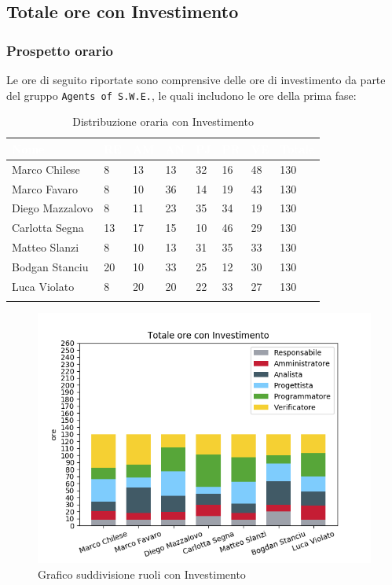 \newpage
\subsection{Totale ore con Investimento}
\label{PTI}
\subsubsection{Prospetto orario}

Le ore di seguito riportate sono comprensive delle ore di investimento da parte del gruppo \texttt{Agents of S.W.E.}, le quali includono le ore della prima fase:

\begin{longtable}{|C{.30\textwidth}|C{.06\textwidth}|C{.06\textwidth}|C{.06\textwidth} | C{.06\textwidth}| C{.06\textwidth} | C{.06\textwidth} | C{.10\textwidth} |}
\hline
{}	\textbf{\textcolor{white}{Nome}} & \textbf{\textcolor{white}{RE}} & \textbf{\textcolor{white}{AM}} & \textbf{\textcolor{white}{AN}} & \textbf{\textcolor{white}{PJ}} & \textbf{\textcolor{white}{PR}} & \textbf{\textcolor{white}{VE}} & \textbf{\textcolor{white}{Totale}}\\
\hline 
Marco Chilese & 8 & 13 & 13 & 32 & 16 & 48 & 130\\
\hline
{}Marco Favaro & 8 & 10 & 36 & 14 & 19 & 43 & 130\\
\hline
Diego Mazzalovo & 8 & 11 & 23 & 35 & 34 & 19 & 130\\
\hline
{}Carlotta Segna & 13 & 17 & 15 & 10 & 46 & 29 & 130\\
\hline
Matteo Slanzi & 8 & 10 & 13 & 31 & 35 & 33 & 130\\
\hline
{}Bodgan Stanciu & 20 & 10 & 33 & 25 & 12 & 30 & 130\\
\hline
Luca Violato & 8 & 20 & 20 & 22 & 33 & 27 & 130 \\
\hline


\caption{Distribuzione oraria con Investimento}
\label{Distribuzione oraria delle ore con investimento}
\end{longtable}

\begin{figure}[H]
	\centering
  		\includegraphics[width=0.8\linewidth]{./images/fig_toi.png}
  		\caption{Grafico suddivisione ruoli con Investimento}
  		\label{fig:grafico suddivione ruoli con investimento}
\end{figure}

